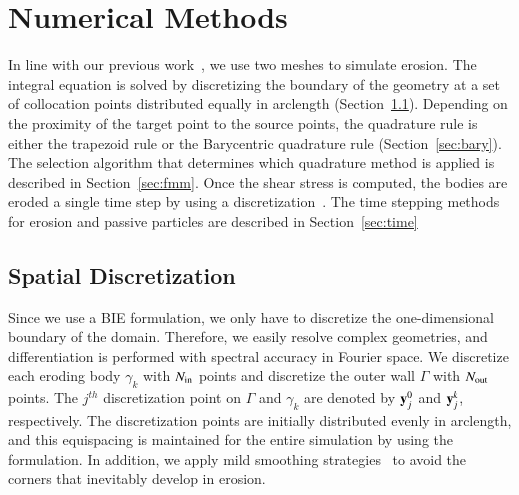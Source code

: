 \documentclass[preprint,10pt]{elsarticle}
\begin{document}
\section{Numerical Methods}
\label{sec:method}
In line with our previous work~\cite{qua-moo2018}, we use two meshes to
simulate erosion. The integral equation is solved by discretizing the
boundary of the geometry at a set of collocation points distributed
equally in arclength (Section~\ref{sec:spatialDiscretization}).
Depending on the proximity of the target point to the source points, the
quadrature rule is either the trapezoid rule or the Barycentric
quadrature rule (Section~\ref{sec:bary}).  The selection algorithm that
determines which quadrature method is applied is described in
Section~\ref{sec:fmm}.  Once the shear stress is computed, the bodies
are eroded a single time step by using a {\thL}
discretization~\cite{hou-low-she1994, moore2013self}.  The time stepping methods for
erosion and passive particles are described in Section~\ref{sec:time}

\subsection{Spatial Discretization}
\label{sec:spatialDiscretization}
Since we use a BIE formulation, we only have to discretize the
one-dimensional boundary of the domain.  Therefore, we easily resolve
complex geometries, and differentiation is performed with spectral
accuracy in Fourier space.  We discretize each eroding body $\gamma_k$
with $N_{\mathrm{in}}$ points and discretize the outer wall $\Gamma$ with
$N_{\mathrm{out}}$ points.  The $j^{th}$ discretization point on $\Gamma$ and
$\gamma_k$ are denoted by ${\mathbf{y}}_j^0$ and ${\mathbf{y}}^k_j$, respectively.  The
discretization points are initially distributed evenly in arclength, and
this equispacing is maintained for the entire simulation by using the
{\thL} formulation.  In addition, we apply mild smoothing
strategies~\cite{qua-moo2018} to avoid the corners that inevitably
develop in erosion.
\end{document}
